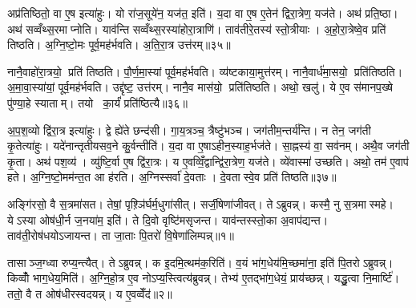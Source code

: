 अप्र॑तिष्ठितो॒ वा ए॒ष इत्या॑हुः। यो रा॑ज॒सूये॑न॒ यज॑त॒ इति॑। य॒दा वा ए॒ष ए॒तेन॑ द्विरा॒त्रेण॒ यज॑ते। अथ॑ प्रति॒ष्ठा। अथ॑ सव्वँथ्स॒रमाप्नोति। याव॑न्ति सव्वँथ्स॒रस्या॑होरा॒त्राणि॑। ताव॑तीरे॒तस्य॑ स्तो॒त्रीयाः। अ॒हो॒रा॒त्रेष्वे॒व प्रति॑ तिष्ठति। अ॒ग्नि॒ष्टो॒मः पूर्व॒मह॑र्भवति। अ॒ति॒रा॒त्र उत्त॑रम्॥३५॥

नानै॒वाहो॑रा॒त्रयो॒ प्रति॑ तिष्ठति। पौ॒र्ण॒मा॒स्यां पूर्व॒मह॑र्भवति। व्य॑ष्टकाया॒मुत्त॑रम्। नानै॒वार्ध॑मा॒सयो॒ प्रति॑तिष्ठति। अ॒मा॒वा॒स्या॑यां॒ पूर्व॒मह॑र्भवति। उद्दृ॑ष्ट॒ उत्त॑रम्। नानै॒व मास॑यो॒ प्रति॑तिष्ठति। अथो॒ खलु॑। ये ए॒व स॑मानप॒ख्षे पु॑ण्या॒हे स्याताम्। तयो का॒र्यं॑ प्रति॑ष्ठित्यै॥३६॥

अ॒प॒श॒व्यो द्वि॑रा॒त्र इत्या॑हुः। द्वे ह्ये॑ते छन्द॑सी। गा॒य॒त्रञ्च॒ त्रैष्टु॑भञ्च। जग॑तीम॒न्तर्य॑न्ति। न तेन॒ जग॑ती कृ॒तेत्या॑हुः। यदे॑नान्तृतीयसव॒ने कु॒र्वन्तीति॑। य॒दा वा ए॒षाऽहीन॒स्याह॒र्भज॑ते। सा॒ह्नस्य॑ वा॒ सव॑नम्। अथै॒व जग॑ती कृ॒ता। अथ॑ पश॒व्य॑। व्यु॑ष्टि॒र्वा ए॒ष द्वि॑रा॒त्रः। य ए॒वव्विँ॒द्वान्द्वि॑रा॒त्रेण॒ यज॑ते। व्ये॑वास्मा॑ उच्छति। अथो॒ तम॑ ए॒वाप॑ हते। अ॒ग्नि॒ष्टो॒मम॑न्त॒त आ ह॑रति। अ॒ग्निस्सर्वा॑ दे॒वताः। दे॒वतास्वे॒व प्रति॑ तिष्ठति॥३७॥

\clearpage
{}



\setcounter{anuvakam}{0}
अङ्गि॑रसो॒ वै स॒त्रमा॑सत। तेषां॒ पृश़्ञि॑र्घर्म॒धुगा॑सीत्। सर्जी॒षेणा॑जीवत्। तेऽब्रुवन्न्। कस्मै॒ नु स॒त्रमास्महे। येऽस्या ओष॑धी॒र्न ज॒नया॑म॒ इति॑। ते दि॒वो वृष्टि॑मसृजन्त। याव॑न्तस्स्तो॒का अ॒वाप॑द्यन्त। ताव॑ती॒रोष॑धयोऽजायन्त। ता जा॒ताः पि॒तरो॑ वि॒षेणा॑लिम्पन्न्॥१॥

तासाञ्ज॒ग्ध्वा रुप्य॒न्त्यैत्। तेऽब्रुवन्न्। क इ॒दमि॒त्थम॑क॒रिति॑। व॒यं भा॑ग॒धेय॑मि॒च्छमा॑ना॒ इति॑ पि॒तरोऽब्रुवन्न्। किव्वोँ॑ भाग॒धेय॒मिति॑। अ॒ग्नि॒हो॒त्र ए॒व नोऽप्य॒स्त्वित्य॑ब्रुवन्न्। तेभ्य॑ ए॒तद्भा॑ग॒धेयं॒ प्राय॑च्छन्न्। यद्धु॒त्वा नि॒मार्ष्टि॑। ततो॒ वै त ओष॑धीरस्वदयन्न्। य ए॒वव्वेँद॑॥२॥

